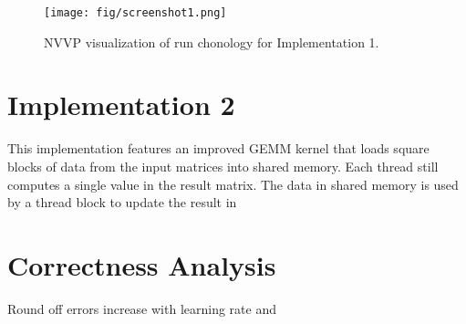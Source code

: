 \documentclass[12pt]{article}
\begin{document}
\begin{figure}[htb]
	\begin{center}
		\texttt{[image: fig/screenshot1.png]}
		\caption{NVVP visualization of run chonology for Implementation 1.}
		\label{fig:screenshot1}
	\end{center}
\end{figure}



\section{Implementation 2}

This implementation features an improved GEMM kernel that loads square blocks of data from the input matrices into shared memory. Each thread still computes a single value in the result matrix. The data in shared memory is used by a thread block to update the result in 

\section{Correctness Analysis}

Round off errors increase with learning rate and 
\end{document}
